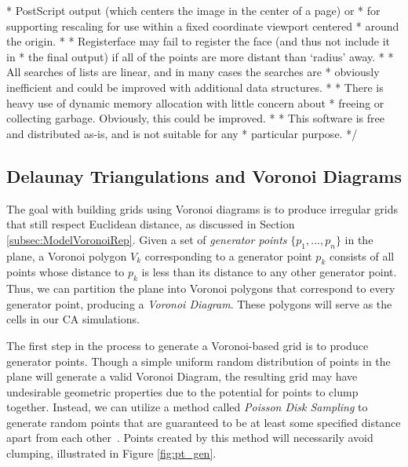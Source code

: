 \documentclass[a4paper,11pt]{report}
\begin{document}
 * PostScript output (which centers the image in the center of a page) or
 * for supporting rescaling for use within a fixed coordinate viewport centered
 * around the origin.
 *
 * Registerface may fail to register the face (and thus not include it in
 * the final output) if all of the points are more distant than `radius' away.
 *
 * All searches of lists are linear, and in many cases the searches are
 * obviously inefficient and could be improved with additional data structures.
 *
 * There is heavy use of dynamic memory allocation with little concern about
 * freeing or collecting garbage.  Obviously, this could be improved.
 *
 * This software is free and distributed as-is, and is not suitable for any
 * particular purpose.
 */


\subsection{Delaunay Triangulations and Voronoi Diagrams}
The goal with building grids using Voronoi diagrams is to produce irregular grids that still respect Euclidean distance, as discussed in Section \ref{subsec:ModelVoronoiRep}. Given a set of \textit{generator points} $\{p_1, ..., p_n\}$ in the plane, a Voronoi polygon $V_k$ corresponding to a generator point $p_k$ consists of all points whose distance to $p_k$ is less than its distance to any other generator point. Thus, we can partition the plane into Voronoi polygons that correspond to every generator point, producing a \textit{Voronoi Diagram}. These polygons will serve as the cells in our CA simulations. 

The first step in the process to generate a Voronoi-based grid is to produce generator points. Though a simple uniform random distribution of points in the plane will generate a valid Voronoi Diagram, the resulting grid may have undesirable geometric properties due to the potential for points to clump together. Instead, we can utilize a method called \textit{Poisson Disk Sampling} to generate random points that are guaranteed to be at least some specified distance apart from each other~\cite{br07}. Points created by this method will necessarily avoid clumping, illustrated in Figure \ref{fig:pt_gen}.
\end{document}
